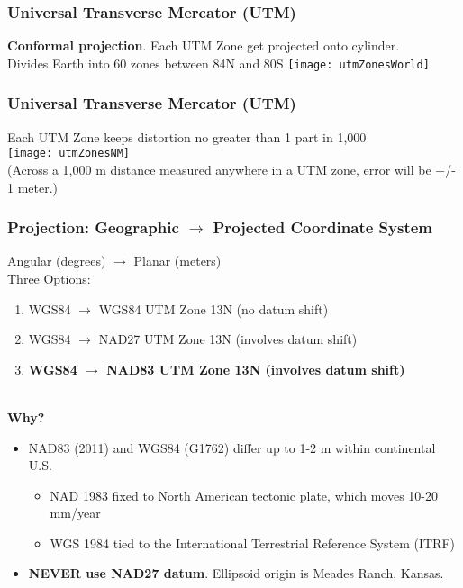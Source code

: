 \documentclass[t]{beamer} %
\begin{document}

\begin{frame}
\frametitle{Universal Transverse Mercator (UTM)}

\textbf{Conformal projection}. Each UTM Zone get projected onto cylinder.\\ 
Divides Earth into 60 zones between 84\degree N and 80\degree S
\texttt{[image: utmZonesWorld]}
\end{frame}


\begin{frame}
\frametitle{Universal Transverse Mercator (UTM)}
Each UTM Zone keeps distortion no greater than 1 part in 1,000\\
\vspace{0.05in}
\texttt{[image: utmZonesNM]}\\
\scriptsize{(Across a 1,000 m distance measured anywhere in a UTM zone, error will be +/- 1 meter.)}\\

\end{frame}


\begin{frame}
\frametitle{Projection: Geographic $\rightarrow$ Projected Coordinate System}
Angular (degrees) $\rightarrow$ Planar (meters)\\

Three Options:
\begin{enumerate}
\item WGS84 $\rightarrow$ WGS84 UTM Zone 13N  (no datum shift)\\
\item WGS84 $\rightarrow$ NAD27 UTM Zone 13N (involves datum shift)\\
\item \large{\textbf{WGS84 $\rightarrow$ NAD83 UTM Zone 13N (involves datum shift)}}\\~\\
\end{enumerate}


\textbf{Why?}\\
\begin{itemize}
\item NAD83 (2011) and WGS84 (G1762) differ up to 1-2 m within continental U.S.\\
\begin{itemize}
	\item NAD 1983 fixed to North American tectonic plate, which moves 10-20 mm/year\\
	\item WGS 1984 tied to the International Terrestrial Reference System (ITRF) 
\end{itemize}
\item \textbf{NEVER use NAD27 datum}. Ellipsoid origin is Meades Ranch, Kansas.
\end{itemize}

\end{frame}
\end{document}

